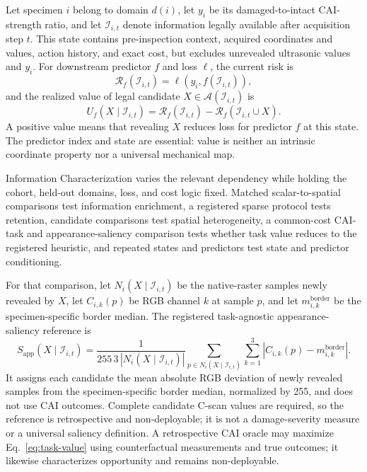 \documentclass[preprint,12pt]{elsarticle}
\newcommand{\risk}{\mathcal{R}}
\newcommand{\legal}{\mathcal{I}}
\newcommand{\actions}{\mathcal{A}}
\begin{document}
Let specimen $i$ belong to domain $d(i)$, let $y_i$ be its damaged-to-intact
CAI-strength ratio, and let $\legal_{i,t}$ denote information legally available
after acquisition step $t$. This state contains pre-inspection context,
acquired coordinates and values, action history, and exact cost, but excludes
unrevealed ultrasonic values and $y_i$. For downstream predictor $f$ and loss
$\ell$, the current risk is
\begin{equation}
  \risk_f(\legal_{i,t})=\ell\!\left(y_i,f(\legal_{i,t})\right),
  \label{eq:state-risk}
\end{equation}
and the realized value of legal candidate $X\in\actions(\legal_{i,t})$ is
\begin{equation}
  U_f(X\mid\legal_{i,t})=
  \risk_f(\legal_{i,t})-
  \risk_f(\legal_{i,t}\cup X).
  \label{eq:task-value}
\end{equation}
A positive value means that revealing $X$ reduces loss for predictor $f$ at
this state. The predictor index and state are essential: value is neither an
intrinsic coordinate property nor a universal mechanical map.

Information Characterization varies the relevant dependency while holding the
cohort, held-out domains, loss, and cost logic fixed. Matched scalar-to-spatial
comparisons test information enrichment, a registered sparse protocol tests
retention, candidate comparisons test spatial heterogeneity, a common-cost
CAI-task and appearance-saliency comparison tests whether task value reduces to
the registered heuristic, and repeated states and predictors test state and
predictor conditioning.

For that comparison, let $N_i(X\mid\legal_{i,t})$ be the native-raster samples
newly revealed by $X$, let $C_{i,k}(p)$ be RGB channel $k$ at sample $p$, and
let $m^{\mathrm{border}}_{i,k}$ be the specimen-specific border median. The
registered task-agnostic appearance-saliency reference is
\begin{equation}
  S_{\mathrm{app}}(X\mid\legal_{i,t})=
  \frac{1}{255\,3\,|N_i(X\mid\legal_{i,t})|}
  \sum_{p\in N_i(X\mid\legal_{i,t})}\sum_{k=1}^{3}
  \left|C_{i,k}(p)-m^{\mathrm{border}}_{i,k}\right|.
  \label{eq:appearance-saliency}
\end{equation}
It assigns each candidate the mean absolute RGB deviation of newly revealed
samples from the specimen-specific border median, normalized by 255, and does
not use CAI outcomes. Complete candidate C-scan values are required, so the
reference is retrospective and non-deployable; it is not a damage-severity
measure or a universal saliency definition. A retrospective CAI oracle may
maximize Eq.~\eqref{eq:task-value} using counterfactual measurements and true
outcomes; it likewise characterizes opportunity and remains non-deployable.
\end{document}
